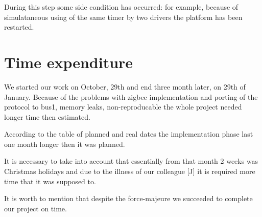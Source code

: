 \documentclass{scrreprt}
\begin{document}
During this step some side condition has occurred:
for example, because of simulataneous using of the same
timer by two drivers the platform has been restarted.


\section{Time expenditure}

We started our work on October, 29th and end three month later, on 29th of January.
Because of the  problems with zigbee implementation and porting of the protocol to bus1,
memory leaks, non-reproducable 
the whole project needed longer time then estimated.

According to the table of planned and real dates the implementation phase
last one month longer then it was planned.

It is necessary to take into account that essentially from that month 
2 weeks was Christmas holidays and due to the illness of our colleague [J]
it is required more time that it was supposed to.


It is worth to mention that despite the force-majeure we succeeded to complete 
our project on time.
\end{document}
